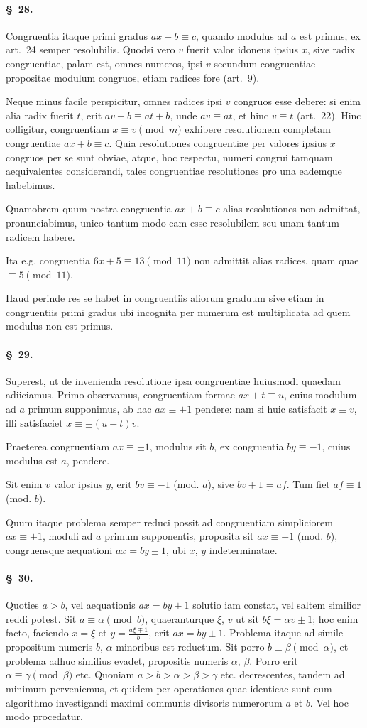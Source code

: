 \documentclass[12pt,a4paper]{article}
\theoremstyle{plain}
\theoremstyle{definition}
\theoremstyle{remark}
\newcommand{\art}[1]{\paragraph{\S\ #1.}}
\begin{document}
\art{28}
Congruentia itaque primi gradus $ax + b \equiv c$, quando modulus ad $a$ est primus, ex art.~24 semper resolubilis. Quodsi vero $v$ fuerit valor idoneus ipsius $x$, sive radix congruentiae, palam est, omnes numeros, ipsi $v$ secundum congruentiae propositae modulum congruos, etiam radices fore (art.~9).

Neque minus facile perspicitur, omnes radices ipsi $v$ congruos esse debere: si enim alia radix fuerit $t$, erit $av + b \equiv at + b$, unde $av \equiv at$, et hinc $v \equiv t$ (art.~22). Hinc colligitur, congruentiam $x \equiv v \pmod{m}$ exhibere resolutionem completam congruentiae $ax + b \equiv c$. Quia resolutiones congruentiae per valores ipsius $x$ congruos per se sunt obviae, atque, hoc respectu, numeri congrui tamquam aequivalentes considerandi, tales congruentiae resolutiones pro una eademque habebimus.

Quamobrem quum nostra congruentia $ax + b \equiv c$ alias resolutiones non admittat, pronunciabimus, unico tantum modo eam esse resolubilem seu unam tantum radicem habere.

Ita e.g. congruentia $6x + 5 \equiv 13 \pmod{11}$ non admittit alias radices, quam quae $\equiv 5 \pmod{11}$.

Haud perinde res se habet in congruentiis aliorum graduum sive etiam in congruentiis primi gradus ubi incognita per numerum est multiplicata ad quem modulus non est primus.

\art{29}
Superest, ut de invenienda resolutione ipsa congruentiae huiusmodi quaedam adiiciamus. Primo observamus, congruentiam formae $ax + t \equiv u$, cuius modulum ad $a$ primum supponimus, ab hac $ax \equiv \pm 1$ pendere: nam si huic satisfacit $x \equiv v$, illi satisfaciet $x \equiv \pm(u-t)v$.

Praeterea congruentiam $ax \equiv \pm 1$, modulus sit $b$, ex congruentia $by \equiv -1$, cuius modulus est $a$, pendere.

Sit enim $v$ valor ipsius $y$, erit $bv \equiv -1$ (mod. $a$), sive $bv + 1 = af$. Tum fiet $af \equiv 1$ (mod. $b$).

Quum itaque problema semper reduci possit ad congruentiam simpliciorem $ax \equiv \pm 1$, moduli ad $a$ primum supponentis, proposita sit $ax \equiv \pm 1$ (mod. $b$), congruensque aequationi $ax = by \pm 1$, ubi $x$, $y$ indeterminatae.

\art{30}
Quoties $a > b$, vel aequationis $ax = by \pm 1$ solutio iam constat, vel saltem similior reddi potest. Sit $a \equiv \alpha \pmod{b}$, quaeranturque $\xi$, $v$ ut sit $b\xi = \alpha v \pm 1$; hoc enim facto, faciendo $x = \xi$ et $y = \frac{a\xi \mp 1}{b}$, erit $ax = by \pm 1$. Problema itaque ad simile propositum numeris $b$, $\alpha$ minoribus est reductum. Sit porro $b \equiv \beta \pmod{\alpha}$, et problema adhuc similius evadet, propositis numeris $\alpha$, $\beta$. Porro erit $\alpha \equiv \gamma \pmod{\beta}$ etc. Quoniam $a > b > \alpha > \beta > \gamma$ etc. decrescentes, tandem ad minimum perveniemus, et quidem per operationes quae identicae sunt cum algorithmo investigandi maximi communis divisoris numerorum $a$ et $b$. Vel hoc modo procedatur.
\end{document}
